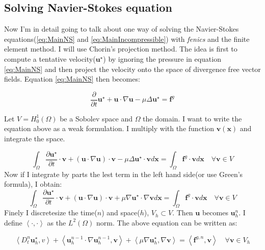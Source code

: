 \documentclass[12pt,a4paper,english]{article}
\begin{document}
\subsection*{Solving Navier-Stokes equation}
Now I'm in detail going to talk about one way of solving the Navier-Stokes equations(\ref{eq:MainNS} and \ref{eq:MainIncompressible}) with \textit{fenics} and the finite element method. I will use Chorin's projection method. The idea is first to compute a tentative velocity($\textbf{u}^\star$) by ignoring the pressure in equation \ref{eq:MainNS} and then project the velocity onto the space of divergence free vector fields. Equation \ref{eq:MainNS} then becomes:

$$
\frac{\partial}{\partial t} \textbf{u}^\star + \textbf{u} \cdot \nabla \textbf{u} - \mu \Delta \textbf{u}^\star = \textbf{f}^g
$$

Let $V = H^{1}_{0}\left( \Omega \right) $ be a Sobolev space and $\Omega$ the domain. I want to write the equation above as a weak formulation. I multiply with the function $\textbf{v}\left(\textbf{x} \right)$ and integrate the space.

$$
\int_\Omega \frac{\partial \textbf{u}^\star}{\partial t} \cdot \textbf{v} + \left( \textbf{u} \cdot \nabla \textbf{u}\right) \cdot \textbf{v} -\mu \Delta \textbf{u}^\star \cdot \textbf{v} d\textbf{x} = \int_\Omega \textbf{f}^g \cdot \textbf{v} d\textbf{x} \quad \forall \textbf{v} \in V
$$
Now if I integrate by parts the lest term in the left hand side(or use Green's formula), I obtain:
$$
\int_\Omega \frac{\partial \textbf{u}^\star}{\partial t} \cdot \textbf{v} + \left( \textbf{u} \cdot \nabla \textbf{u}\right) \cdot \textbf{v} +\mu \nabla \textbf{u}^\star \cdot \nabla \textbf{v} d\textbf{x} = \int_\Omega \textbf{f}^g \cdot \textbf{v} d\textbf{x} \quad \forall \textbf{v} \in V
$$
Finely I discretesize the time($n$) and space($h$), $V_h\subset V$. Then $\textbf{u}$ becomes $\textbf{u}^{n}_{h}$. I define $\left\langle \cdot , \cdot \right\rangle$ as the $L^2\left( \Omega \right)$ norm. The above equation can be written as:

\begin{equation}
\left\langle D^{n}_{t} \textbf{u}^{\star}_{h} , v \right\rangle + \left\langle \textbf{u}^{n-1}_{h} \cdot \nabla \textbf{u}^{n-1}_{h} , \textbf{v} \right\rangle +  \left\langle \mu \nabla \textbf{u}^{\star}_{h} , \nabla \textbf{v} \right\rangle = \left\langle \textbf{f}^{g,n} , \textbf{v} \right\rangle \quad \forall \textbf{v} \in V_h
\label{eq:discreteNS}
\end{equation}
  
\end{document}
